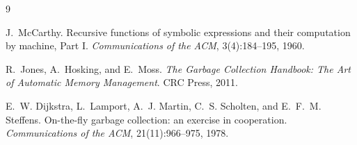 \documentclass[11pt]{article}
\begin{document}
\begin{thebibliography}{9}

J.~McCarthy.
\newblock Recursive functions of symbolic expressions and their computation by machine, Part I.
\newblock \emph{Communications of the ACM}, 3(4):184--195, 1960.

R.~Jones, A.~Hosking, and E.~Moss.
\newblock \emph{The Garbage Collection Handbook: The Art of Automatic Memory Management}.
\newblock CRC Press, 2011.

E.~W. Dijkstra, L.~Lamport, A.~J. Martin, C.~S. Scholten, and E.~F.~M. Steffens.
\newblock On-the-fly garbage collection: an exercise in cooperation.
\newblock \emph{Communications of the ACM}, 21(11):966--975, 1978.

\end{thebibliography}
\end{document}
